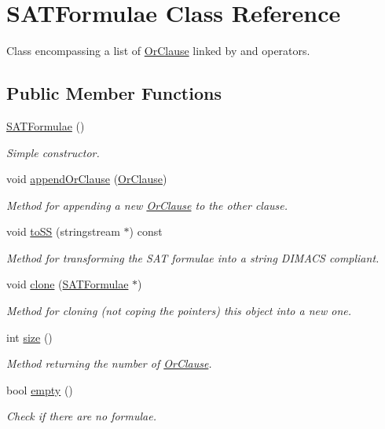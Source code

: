 \hypertarget{classSATFormulae}{\section{S\-A\-T\-Formulae Class Reference}
\label{classSATFormulae}
}


Class encompassing a list of {\ttfamily \hyperlink{classOrClause}{Or\-Clause}} linked by and operators.  


\subsection*{Public Member Functions}
\begin{DoxyCompactItemize}
\item 
\hypertarget{classSATFormulae_a5120c3a2469b8124be715fa0d97fc545}{\hyperlink{classSATFormulae_a5120c3a2469b8124be715fa0d97fc545}{S\-A\-T\-Formulae} ()}\label{classSATFormulae_a5120c3a2469b8124be715fa0d97fc545}

\begin{DoxyCompactList}\small\item\em Simple constructor. \end{DoxyCompactList}\item 
void \hyperlink{classSATFormulae_a24f192aef15c7338da94440fbf11a1fd}{append\-Or\-Clause} (\hyperlink{classOrClause}{Or\-Clause})
\begin{DoxyCompactList}\small\item\em Method for appending a new \hyperlink{classOrClause}{Or\-Clause} to the other clause. \end{DoxyCompactList}\item 
void \hyperlink{classSATFormulae_aa2f0f69c190ff01d8ab48e426d89e665}{to\-S\-S} (stringstream $\ast$) const 
\begin{DoxyCompactList}\small\item\em Method for transforming the S\-A\-T formulae into a string {\ttfamily D\-I\-M\-A\-C\-S} compliant. \end{DoxyCompactList}\item 
void \hyperlink{classSATFormulae_a613cef1d45631a255b65718f51c5024c}{clone} (\hyperlink{classSATFormulae}{S\-A\-T\-Formulae} $\ast$)
\begin{DoxyCompactList}\small\item\em Method for cloning (not coping the pointers) this object into a new one. \end{DoxyCompactList}\item 
int \hyperlink{classSATFormulae_a8f519b3240b275633769ed70c9583d5d}{size} ()
\begin{DoxyCompactList}\small\item\em Method returning the number of \hyperlink{classOrClause}{Or\-Clause}. \end{DoxyCompactList}\item 
bool \hyperlink{classSATFormulae_a7c56233149efa47f3533010b09daf42b}{empty} ()
\begin{DoxyCompactList}\small\item\em Check if there are no formulae. \end{DoxyCompactList}\end{DoxyCompactItemize}



